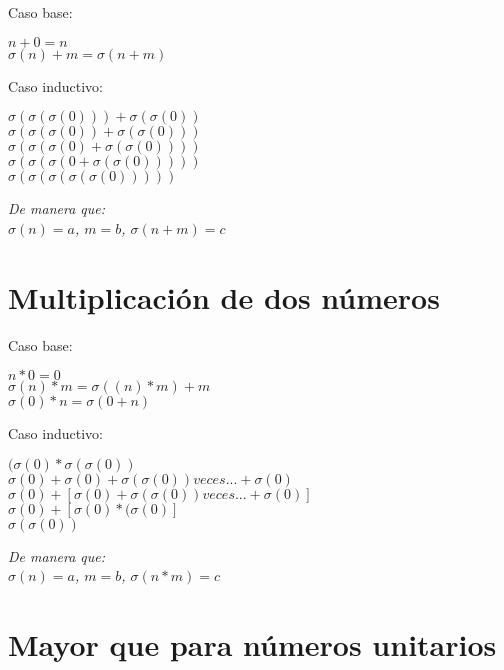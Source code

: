 \documentclass[10pt,a4paper]{article}
\begin{document}
        Caso base: 
        \begin{center}
        $n + 0 = n$\\
        $\sigma(n) + m = \sigma(n+m)$
        \end{center}
        Caso inductivo:
        \begin{center}
        $\sigma(\sigma(\sigma(0))) + \sigma(\sigma(0))$\\
        $\sigma(\sigma(\sigma(0)) +\sigma(\sigma(0))) $\\
        $\sigma(\sigma(\sigma(0) +\sigma(\sigma(0)))) $\\
        $\sigma(\sigma(\sigma(0 +\sigma(\sigma(0))))) $\\
        $\sigma(\sigma(\sigma(\sigma(\sigma(0)))))$
        \end{center}
        \emph{De manera que:\\
        $\sigma(n) = a$, $m = b$, $\sigma(n+m)= c$}
    
        \section*{Multiplicaci\'on de dos n\'umeros}
        
        Caso base: 
        \begin{center}
        $n * 0 =0$\\
        $\sigma(n) * m = \sigma((n)*m) +m$\\
        $\sigma(0) * n = \sigma(0 + n)$\\
        \end{center}
        Caso inductivo:
        \begin{center}
		$(\sigma(0) * \sigma(\sigma(0))$\\
		$\sigma(0) + \sigma(0) + \sigma(\sigma(0))veces...+\sigma(0)$\\
		$\sigma(0) + [\sigma(0) + \sigma(\sigma(0))veces...+\sigma(0)] $\\
		$\sigma(0)+ [\sigma(0) * (\sigma(0)] $\\
		$\sigma(\sigma(0))$
        \end{center}
        \emph{De manera que:\\
        $\sigma(n) = a$, $m = b$, $\sigma(n*m) = c$}
            
        \section*{Mayor que para n\'umeros unitarios}
        
\end{document}
